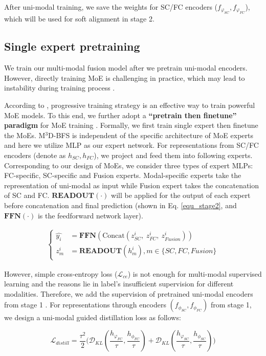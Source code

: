 \documentclass[10pt,twocolumn,letterpaper]{article}
\begin{document}
After uni-modal training, we save the weights for SC/FC encoders ($f_{\varphi_{SC}}, f_{\varphi_{FC}}$), which will be used for soft alignment in stage 2.


\subsection{Single expert pretraining}
We train our multi-modal fusion model after we pretrain uni-modal encoders. However, directly training MoE is challenging in practice, which may lead to instability during training process \cite{shazeer2017outrageously}. 

According to \cite{li2024uni,lin2024moe,chen2024eve}, progressive training strategy is an effective way to train powerful MoE models. To this end, we further adopt a \textbf{``pretrain then finetune'' paradigm} for MoE training \cite{li2024uni}. Formally, we first train single expert then finetune the MoEs. M$^3$D-BFS is independent of the specific architecture of MoE experts and here we utilize MLP as our expert network. For representations from SC/FC encoders (denote as $h_{SC}, h_{FC}$), we project and feed them into following experts.  Corresponding to our design of MoEs, we consider three types of expert MLPs: FC-specific, SC-specific and Fusion experts. Modal-specific experts take the representation of uni-modal as input while Fusion expert takes the concatenation of SC and FC. $\textbf{READOUT}(\cdot)$ will be applied for the output of each expert before concatenation and final prediction (shown in Eq. \ref{equ_stage2}, and $\textbf{FFN}(\cdot)$ is the feedforward network layer).
\begin{small}
\begin{equation}
\begin{aligned}
\begin{cases}
    \label{equ_stage2}
    \hat{y_i} &= \textbf{FFN}(\text{Concat}(z_{SC}^i , \ z_{FC}^i , \ z_{Fusion}^i))
    \\
    z^i_m &= \textbf{READOUT}(h_m^i), m \in \{SC, FC, Fusion\}
\end{cases}
\end{aligned}
\end{equation}
\end{small}

However, simple cross-entropy loss ($\mathcal{L}_{ce}$) is not enough for multi-modal supervised learning and the reasons lie in label's insufficient supervision for different modalities. Therefore, we add the supervision of pretrained uni-modal encoders from stage 1 \cite{du2023uni}. For representations through encoders $(f_{\phi_{SC}}, f_{\phi_{FC}})$ from stage 1, we design a uni-modal guided distillation loss as follows:
\begin{small}
    \begin{equation}
        \mathcal{L}_{distill} = \frac{\tau^2}{2} \bigg ( \mathcal D_{KL}(\frac{h_{\varphi_{FC}}}{\tau},\frac{h_{\phi_{FC}}}{\tau}) + \mathcal{D}_{KL}(\frac{h_{\varphi_{SC}}}{\tau},\frac{h_{\phi_{SC}}}{\tau})\bigg )
    \end{equation}
\end{small}
\end{document}
